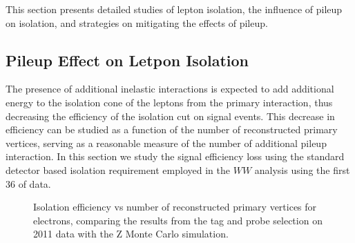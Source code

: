 This section presents detailed studies of lepton isolation, the influence of pileup on isolation,
and strategies on mitigating the effects of pileup. 


\subsection{Pileup Effect on Letpon Isolation}


The presence of additional inelastic interactions is expected to add 
additional energy to the isolation cone of the leptons from the primary 
interaction, thus decreasing the efficiency of the isolation cut on signal 
events. This decrease in efficiency can be studied as a function of the 
number of reconstructed primary vertices, serving as a reasonable measure 
of the number of additional pileup interaction. In this section we study
the signal efficiency loss using the standard detector based isolation
requirement employed in the $WW$ analysis using the first $36$ \ipb of data. 

\begin{figure}[!htbp]
\begin{center}
\caption{Isolation efficiency vs number of reconstructed primary vertices for electrons, comparing the 
results from the tag and probe selection on 2011 data with the Z Monte Carlo simulation.}
\label{fig:eleIsoEff_TagAndProbe_vs_NVertices}
\end{center}
\end{figure}


